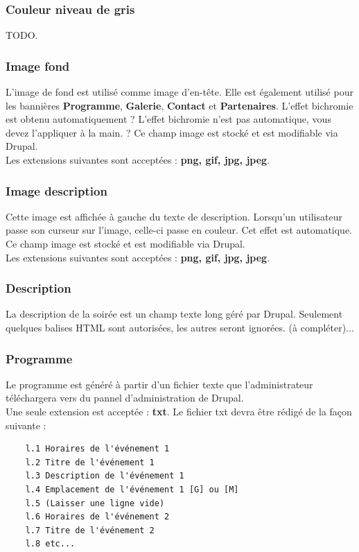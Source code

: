 \documentclass[11pt]{report}
\begin{document}
\subsubsection{Couleur niveau de gris}

TODO.

\subsubsection{Image fond}

L'image de fond est utilisé comme image d'en-tête. Elle est également utilisé
pour les bannières \textbf{Programme}, \textbf{Galerie}, \textbf{Contact} et
\textbf{Partenaires}. L'effet bichromie est obtenu automatiquement ? L'effet
bichromie n'est pas automatique, vous devez l'appliquer à la main. ?
Ce champ image est stocké et est modifiable via Drupal. \\
Les extensions suivantes sont acceptées : \textbf{png, gif, jpg, jpeg}.

\subsubsection{Image description}

Cette image est affichée à gauche du texte de description. Lorsqu'un utilisateur
passe son curseur sur l'image, celle-ci passe en couleur. Cet effet est automatique.
Ce champ image est stocké et est modifiable via Drupal. \\
Les extensions suivantes sont acceptées : \textbf{png, gif, jpg, jpeg}.

\subsubsection{Description}

La description de la soirée est un champ texte long géré par Drupal.
Seulement quelques balises HTML sont autorisées, les autres seront ignorées.
(à compléter)...

\subsubsection{Programme}

Le programme est généré à partir d'un fichier texte que l'administrateur
téléchargera vers du pannel d'administration de Drupal. \\
Une seule extension est acceptée : \textbf{txt}.
Le fichier txt devra être rédigé de la façon suivante :
\begin{verbatim}
	l.1 Horaires de l'événement 1
	l.2 Titre de l'événement 1
	l.3 Description de l'événement 1
	l.4 Emplacement de l'événement 1 [G] ou [M]
	l.5 (Laisser une ligne vide)
	l.6 Horaires de l'événement 2
	l.7 Titre de l'événement 2
	l.8 etc...
\end{verbatim}
\end{document}
